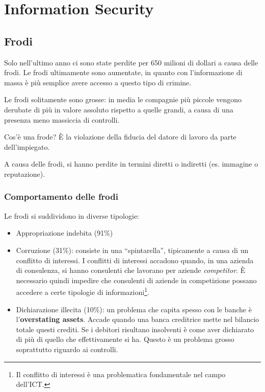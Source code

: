 \part{Information Security}

\chapter{Frodi}
\label{Frodi}

Solo nell'ultimo anno ci sono state perdite per 650 milioni di dollari
a causa delle frodi. Le frodi ultimamente sono aumentate, 
in quanto con l'informazione di massa è più semplice avere accesso a 
questo tipo di crimine.

Le frodi solitamente sono grosse: in media le compagnie più piccole vengono
derubate di più in valore assoluto rispetto a quelle grandi, a causa di una 
presenza meno massiccia di controlli.

Cos'è una frode? È la violazione della fiducia del datore di lavoro da parte 
dell'impiegato.

A causa delle frodi, si hanno perdite in termini diretti o 
indiretti (es. immagine o reputazione).

\section{Comportamento delle frodi}

Le frodi si suddividono in diverse tipologie:

\begin{itemize}
  \item Appropriazione indebita (91\%)
  \item Corruzione (31\%): consiste in una ``spintarella'', tipicamente a causa di un conflitto di 
  interessi. I conflitti di interessi accadono quando, in una azienda di 
  consulenza, si hanno consulenti che lavorano per aziende \textit{competitor}.
  È necessario quindi impedire che consulenti di aziende in competizione possano 
  accedere a   certe tipologie di informazioni\footnote{Il conflitto di interessi è una
  problematica fondamentale nel campo dell'ICT.}.
  \item Dichiarazione illecita (10\%): un problema che capita spesso con le banche è l'\textbf{overstating assets}.
  Accade quando una banca creditrice mette nel bilancio totale questi crediti.
  Se i debitori risultano insolventi è come aver dichiarato di più di quello
  che effettivamente si ha. Questo è un problema grosso soprattutto riguardo ai
  controlli.
\end{itemize}

